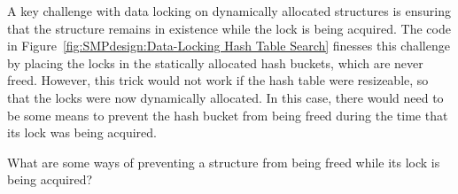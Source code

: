 A key challenge with data locking on dynamically allocated structures
is ensuring that the structure remains in existence while the lock is
being acquired.
The code in
Figure~\ref{fig:SMPdesign:Data-Locking Hash Table Search}
finesses this challenge by placing the locks in the statically allocated
hash buckets, which are never freed.
However, this trick would not work if the hash table were resizeable,
so that the locks were now dynamically allocated.
In this case, there would need to be some means to prevent the hash
bucket from being freed during the time that its lock was being acquired.

\QuickQuiz{}
	What are some ways of preventing a structure from being freed while
	its lock is being acquired?
